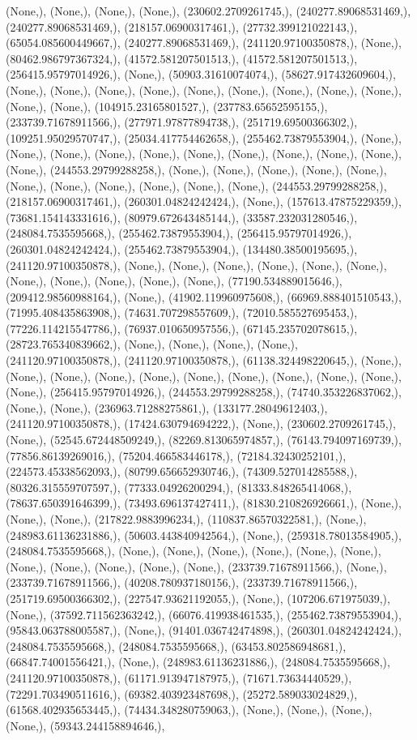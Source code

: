 \documentclass{article}
\begin{document}
(None,), (None,), (None,), (None,), (230602.2709261745,), (240277.89068531469,), (240277.89068531469,), (218157.06900317461,), (27732.399121022143,), (65054.085600449667,), (240277.89068531469,), (241120.97100350878,), (None,), (80462.986797367324,), (41572.581207501513,), (41572.581207501513,), (256415.95797014926,), (None,), (50903.31610074074,), (58627.917432609604,), (None,), (None,), (None,), (None,), (None,), (None,), (None,), (None,), (None,), (None,), (None,), (104915.23165801527,), (237783.65652595155,), (233739.71678911566,), (277971.97877894738,), (251719.69500366302,), (109251.95029570747,), (25034.417754462658,), (255462.73879553904,), (None,), (None,), (None,), (None,), (None,), (None,), (None,), (None,), (None,), (None,), (None,), (244553.29799288258,), (None,), (None,), (None,), (None,), (None,), (None,), (None,), (None,), (None,), (None,), (None,), (244553.29799288258,), (218157.06900317461,), (260301.04824242424,), (None,), (157613.47875229359,), (73681.154143331616,), (80979.672643485144,), (33587.232031280546,), (248084.7535595668,), (255462.73879553904,), (256415.95797014926,), (260301.04824242424,), (255462.73879553904,), (134480.38500195695,), (241120.97100350878,), (None,), (None,), (None,), (None,), (None,), (None,), (None,), (None,), (None,), (None,), (None,), (77190.534889015646,), (209412.98560988164,), (None,), (41902.119960975608,), (66969.888401510543,), (71995.408435863908,), (74631.707298557609,), (72010.585527695453,), (77226.114215547786,), (76937.010650957556,), (67145.235702078615,), (28723.765340839662,), (None,), (None,), (None,), (None,), (241120.97100350878,), (241120.97100350878,), (61138.324498220645,), (None,), (None,), (None,), (None,), (None,), (None,), (None,), (None,), (None,), (None,), (None,), (256415.95797014926,), (244553.29799288258,), (74740.353226837062,), (None,), (None,), (236963.71288275861,), (133177.28049612403,), (241120.97100350878,), (17424.630794694222,), (None,), (230602.2709261745,), (None,), (52545.672448509249,), (82269.813065974857,), (76143.794097169739,), (77856.86139269016,), (75204.466583446178,), (72184.32430252101,), (224573.45338562093,), (80799.656652930746,), (74309.527014285588,), (80326.315559707597,), (77333.04926200294,), (81333.848265414068,), (78637.650391646399,), (73493.696137427411,), (81830.210826926661,), (None,), (None,), (None,), (217822.9883996234,), (110837.86570322581,), (None,), (248983.61136231886,), (50603.443840942564,), (None,), (259318.78013584905,), (248084.7535595668,), (None,), (None,), (None,), (None,), (None,), (None,), (None,), (None,), (None,), (None,), (None,), (233739.71678911566,), (None,), (233739.71678911566,), (40208.780937180156,), (233739.71678911566,), (251719.69500366302,), (227547.93621192055,), (None,), (107206.671975039,), (None,), (37592.711562363242,), (66076.419938461535,), (255462.73879553904,), (95843.063788005587,), (None,), (91401.036742474898,), (260301.04824242424,), (248084.7535595668,), (248084.7535595668,), (63453.802586948681,), (66847.74001556421,), (None,), (248983.61136231886,), (248084.7535595668,), (241120.97100350878,), (61171.913947187975,), (71671.73634440529,), (72291.703490511616,), (69382.403923487698,), (25272.589033024829,), (61568.402935653445,), (74434.348280759063,), (None,), (None,), (None,), (None,), (59343.244158894646,), 
\end{document}
